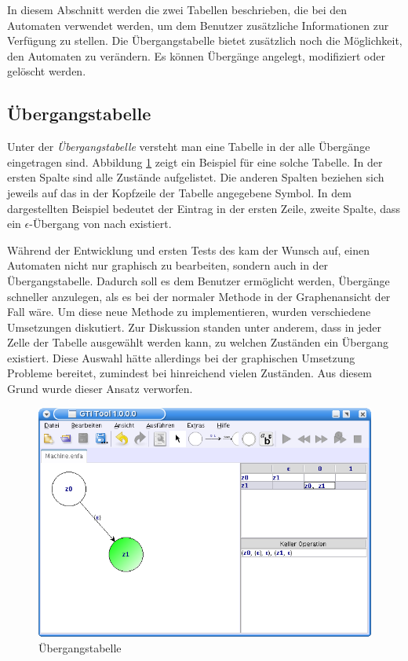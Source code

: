 In diesem Abschnitt werden die zwei Tabellen beschrieben, die bei den Automaten
verwendet werden, um dem Benutzer zusätzliche Informationen zur Verfügung zu
stellen. Die Übergangstabelle bietet zusätzlich noch die Möglichkeit, den
Automaten zu verändern. Es können Übergänge angelegt, modifiziert oder gelöscht
werden.\vspace{10pt}


\subsection{Übergangstabelle}\label{TablesTransition}

Unter der {\em Übergangstabelle} versteht man eine Tabelle in der alle
Übergänge eingetragen sind. Abbildung \ref{FigureMachineTable} zeigt ein
Beispiel für eine solche Tabelle. In der ersten Spalte sind alle Zustände
aufgelistet. Die anderen Spalten beziehen sich jeweils auf das in der Kopfzeile
der Tabelle angegebene Symbol. In dem dargestellten Beispiel bedeutet der
Eintrag in der ersten Zeile, zweite Spalte, dass ein $\epsilon$-Übergang von
 nach  existiert.\vspace{10pt}

Während der Entwicklung und ersten Tests des \gtitools kam der Wunsch auf, einen
Automaten nicht nur graphisch zu bearbeiten, sondern auch in der
Übergangstabelle. Dadurch soll es dem Benutzer ermöglicht werden, Übergänge
schneller anzulegen, als es bei der normaler Methode in der Graphenansicht der
Fall wäre. Um diese neue Methode zu implementieren, wurden verschiedene
Umsetzungen diskutiert. Zur Diskussion standen unter anderem, dass in jeder Zelle
der Tabelle ausgewählt werden kann, zu welchen Zuständen ein Übergang existiert.
Diese Auswahl hätte allerdings bei der graphischen Umsetzung Probleme bereitet,
zumindest bei hinreichend vielen Zuständen. Aus diesem Grund wurde dieser Ansatz
verworfen.\vspace{10pt}

\begin{figure}[h!]
\begin{center}
\includegraphics[width=12cm]{../images/machine_table.png}
\caption{Übergangstabelle}
\label{FigureMachineTable}
\end{center}
\end{figure}
\vspace{10pt}

